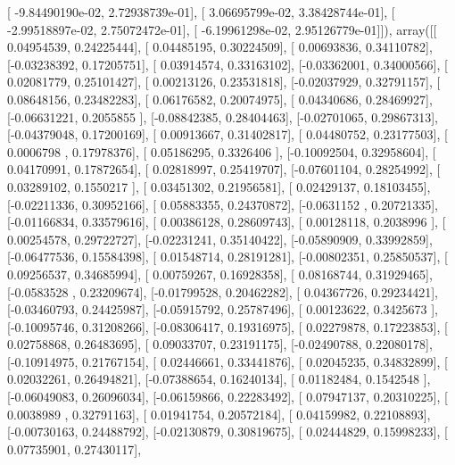 \documentclass{article}
\begin{document}
       [ -9.84490190e-02,   2.72938739e-01],
       [  3.06695799e-02,   3.38428744e-01],
       [ -2.99518897e-02,   2.75072472e-01],
       [ -6.19961298e-02,   2.95126779e-01]]), array([[ 0.04954539,  0.24225444],
       [ 0.04485195,  0.30224509],
       [ 0.00693836,  0.34110782],
       [-0.03238392,  0.17205751],
       [ 0.03914574,  0.33163102],
       [-0.03362001,  0.34000566],
       [ 0.02081779,  0.25101427],
       [ 0.00213126,  0.23531818],
       [-0.02037929,  0.32791157],
       [ 0.08648156,  0.23482283],
       [ 0.06176582,  0.20074975],
       [ 0.04340686,  0.28469927],
       [-0.06631221,  0.2055855 ],
       [-0.08842385,  0.28404463],
       [-0.02701065,  0.29867313],
       [-0.04379048,  0.17200169],
       [ 0.00913667,  0.31402817],
       [ 0.04480752,  0.23177503],
       [ 0.0006798 ,  0.17978376],
       [ 0.05186295,  0.3326406 ],
       [-0.10092504,  0.32958604],
       [ 0.04170991,  0.17872654],
       [ 0.02818997,  0.25419707],
       [-0.07601104,  0.28254992],
       [ 0.03289102,  0.1550217 ],
       [ 0.03451302,  0.21956581],
       [ 0.02429137,  0.18103455],
       [-0.02211336,  0.30952166],
       [ 0.05883355,  0.24370872],
       [-0.0631152 ,  0.20721335],
       [-0.01166834,  0.33579616],
       [ 0.00386128,  0.28609743],
       [ 0.00128118,  0.2038996 ],
       [ 0.00254578,  0.29722727],
       [-0.02231241,  0.35140422],
       [-0.05890909,  0.33992859],
       [-0.06477536,  0.15584398],
       [ 0.01548714,  0.28191281],
       [-0.00802351,  0.25850537],
       [ 0.09256537,  0.34685994],
       [ 0.00759267,  0.16928358],
       [ 0.08168744,  0.31929465],
       [-0.0583528 ,  0.23209674],
       [-0.01799528,  0.20462282],
       [ 0.04367726,  0.29234421],
       [-0.03460793,  0.24425987],
       [-0.05915792,  0.25787496],
       [ 0.00123622,  0.3425673 ],
       [-0.10095746,  0.31208266],
       [-0.08306417,  0.19316975],
       [ 0.02279878,  0.17223853],
       [ 0.02758868,  0.26483695],
       [ 0.09033707,  0.23191175],
       [-0.02490788,  0.22080178],
       [-0.10914975,  0.21767154],
       [ 0.02446661,  0.33441876],
       [ 0.02045235,  0.34832899],
       [ 0.02032261,  0.26494821],
       [-0.07388654,  0.16240134],
       [ 0.01182484,  0.1542548 ],
       [-0.06049083,  0.26096034],
       [-0.06159866,  0.22283492],
       [ 0.07947137,  0.20310225],
       [ 0.0038989 ,  0.32791163],
       [ 0.01941754,  0.20572184],
       [ 0.04159982,  0.22108893],
       [-0.00730163,  0.24488792],
       [-0.02130879,  0.30819675],
       [ 0.02444829,  0.15998233],
       [ 0.07735901,  0.27430117],
\end{document}
